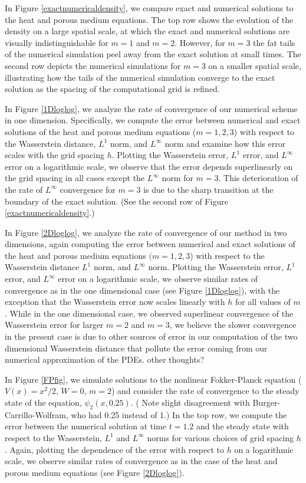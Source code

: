 \documentclass[11pt,leqno]{amsart}
\theoremstyle{definition}
\begin{document}
In Figure \ref{exactnumericaldensity}, we compare exact and numerical solutions to the heat and porous medium equations. The top row shows the evolution of the density on a large spatial scale, at which the exact and numerical solutions are visually indistinguishable for $m=1$ and $m=2$. However, for $m=3$ the fat tails of the numerical simulation peel away from the exact solution at small times. The second row depicts the numerical simulations for $m=3$ on a smaller spatial scale, illustrating how the tails of the numerical simulation converge to the exact solution as the spacing of the computational grid is refined.

In Figure \ref{1Dloglog}, we analyze the rate of convergence of our numerical scheme in one dimension. Specifically, we compute the error between numerical and exact solutions of the heat and porous medium equations ($m =1, 2,3$) with respect to the Wasserstein distance, $L^1$ norm, and $L^\infty$ norm and examine how this error scales with the grid spacing $h$.  Plotting the Wasserstein error, $L^1$ error, and $L^\infty$ error on a logarithmic scale, we observe that the error depends superlinearly on the grid spacing in all cases except the $L^\infty$ norm for $m=3$. This deterioration of the rate of $L^\infty$ convergence for $m=3$ is due to the sharp transition at the boundary of the exact solution. (See the second row of Figure \ref{exactnumericaldensity}.) 

In Figure \ref{2Dloglog}, we analyze the rate of convergence of our method in two dimensions, again computing the error between numerical and exact solutions of the heat and porous medium equations $(m=1,2,3$) with respect to the Wasserstein distance $L^1$ norm, and $L^\infty$ norm. Plotting the Wasserstein error, $L^1$ error, and $L^\infty$ error on a logarithmic scale, we observe similar rates of convergence as in the one dimensional case (see Figure \ref{1Dloglog}), with the exception that the Wasserstein error now scales linearly with $h$ for all values of $m$. While in the one dimensional case, we observed superlinear convergence of the Wasserstein error for larger $m =2$ and $m=3$, we believe the slower convergence in the present case is due to other sources of error in our computation of the two dimensional Wasserstein distance that pollute the error coming from our numerical approximation of the PDEs. {\color{Aquamarine} other thoughts? }

In Figure \ref{FPfig}, we simulate solutions to the nonlinear Fokker-Planck equation ($V(x) = x^2/2$, $W=0$, $m=2$) and consider the rate of convergence to the steady state of the equation, $\psi_2(x,0.25)$. ({\color{Aquamarine} Note slight disagreement with Burger-Carrillo-Wolfram, who had 0.25 instead of 1.)} In the top row, we compute the error between the numerical solution at time $t=1.2$ and the steady state with respect to the Wasserstein, $L^1$ and $L^\infty$ norms for various choices of grid spacing $h$. Again, plotting the dependence of the error with respect to $h$ on a logarithmic scale, we observe similar rates of convergence as in the case of the heat and porous medium equations (see Figure \ref{2Dloglog}).
\end{document}

